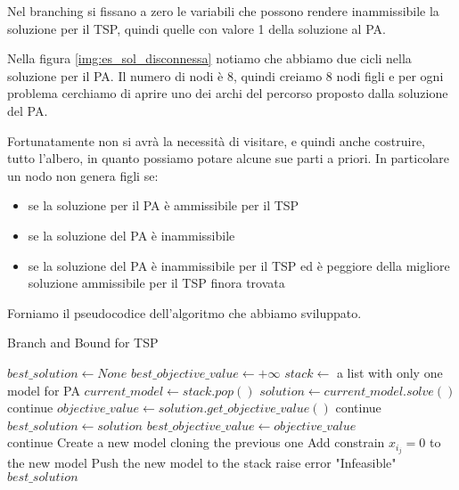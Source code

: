 Nel branching si fissano a zero le variabili che possono rendere inammissibile la soluzione per il TSP, quindi quelle con valore 1 della soluzione al PA.

Nella figura \ref{img:es_sol_disconnessa} notiamo che abbiamo due cicli nella soluzione per il PA. Il numero di nodi è 8, quindi creiamo 8 nodi figli e per ogni problema cerchiamo di aprire uno dei archi del percorso proposto dalla soluzione del PA.

Fortunatamente non si avrà la necessità di visitare, e quindi anche costruire, tutto l'albero, in quanto possiamo potare alcune sue parti a priori. In particolare un nodo non genera figli se:

\begin{itemize}
    \item se la soluzione per il PA è ammissibile per il TSP
    \item se la soluzione del PA è inammissibile
    \item se la soluzione del PA è inammissibile per il TSP ed è peggiore della migliore soluzione ammissibile per il TSP finora trovata
\end{itemize}

\newpage
Forniamo il pseudocodice dell'algoritmo che abbiamo sviluppato.

\begin{algorithm}
\caption{Branch and Bound for TSP}\label{alg:brand:and_bound_pseudocode}
\begin{algorithmic}
\State $best\_solution \gets None$
\State $best\_objective\_value \gets +\infty$
\State $stack \gets$ a list with only one model for PA
    \State $current\_model \gets stack.pop()$
    \State $solution \gets current\_model.solve()$
        continue  
    \EndIf
    \State $objective\_value \gets solution.get\_objective\_value()$
        continue  
    \EndIf
        \State $best\_solution \gets solution$
        \State $best\_objective\_value \gets objective\_value$\\
        \quad \quad \quad continue
    \EndIf
            \State Create a new model cloning the previous one
            \State Add constrain $x_{i_j} = 0$ to the new model
            \State Push the new model to the stack
        \EndIf
    \EndFor
\EndWhile
{}
        \State raise error "Infeasible"
\EndIf \\
\Return$best\_solution$
\end{algorithmic}
\end{algorithm}

